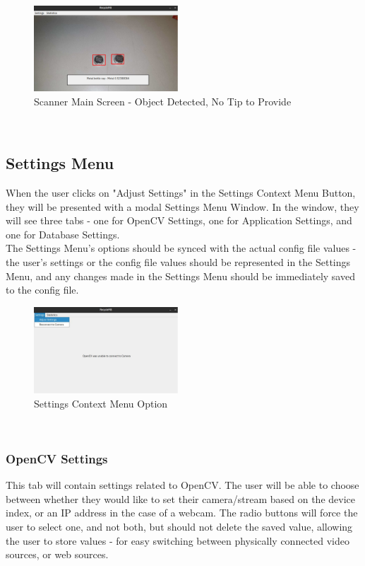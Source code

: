 \documentclass[conference]{IEEEtran}
\begin{document}
\begin{figure}[!h]
    \centering
    \includegraphics[width=0.48\textwidth]{images/bottlecap_detected.eps}
    \caption{Scanner Main Screen - Object Detected, No Tip to Provide}
\end{figure}~\\

\newpage
\subsection{Settings Menu}
When the user clicks on "Adjust Settings" in the Settings Context Menu Button, they will be presented with a modal Settings Menu Window. In the window, they will see three tabs - one for OpenCV Settings, one for Application Settings, and one for Database Settings.~\\

The Settings Menu's options should be synced with the actual config file values - the user's settings or the config file values should be represented in the Settings Menu, and any changes made in the Settings Menu should be immediately saved to the config file.~\\

\begin{figure}[!h]
    \centering
    \includegraphics[width=0.48\textwidth]{images/adjust_settings.eps}
    \caption{Settings Context Menu Option}
\end{figure}~\\

\newpage
\subsubsection{OpenCV Settings}
This tab will contain settings related to OpenCV. The user will be able to choose between whether they would like to set their camera/stream based on the device index, or an IP address in the case of a webcam. The radio buttons will force the user to select one, and not both, but should not delete the saved value, allowing the user to store values - for easy switching between physically connected video sources, or web sources.~\\
\end{document}
